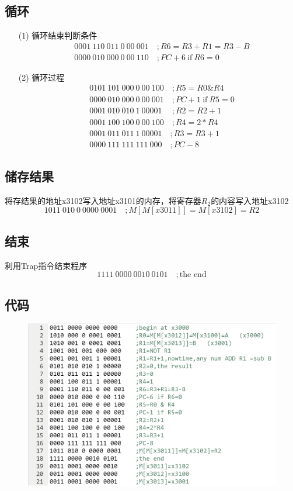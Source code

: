 \documentclass[UTF8]{ctexart}
\begin{document}
\subsection{循环}
\begin{enumerate}
    \item [(1)]循环结束判断条件
    \begin{align*}
        &0001\ 110\ 011\ 0\ 00\ 001\quad   ;R6=R3+R1=R3-B\\
        &0000\ 010\ 000\ 0\ 00\ 110\quad   ;PC+6\ \mbox{if}\ R6=0
    \end{align*}
    \item [(2)]循环过程
    \begin{align*}
        &0101\ 101\ 000\ 0\ 00\ 100\quad   ;R5=R0 \& R4\\
        &0000\ 010\ 000\ 0\ 00\ 001\quad   ;PC+1\ \mbox{if}\ R5=0\\
        &0001\ 010\ 010\ 1\ 00001\ \quad   ;R2=R2+1\\
        &0001\ 100\ 100\ 0\ 00\ 100\quad   ;R4=2*R4\\
        &0001\ 011\ 011\ 1\ 00001 \quad   ;R3=R3+1\\
        &0000\ 111\ 111\ 111\ 000 \quad   ;PC-8
    \end{align*}
\end{enumerate}

\subsection{储存结果}
    将存结果的地址x3102写入地址x3101的内存，将寄存器$R_2$的内容写入地址x3102
    \[
        1011\ 010\ 0\ 0000\ 0001\quad    ;M[M[x3011]]=M[x3102]=R2
    \]
\subsection{结束}  
    利用Trap指令结束程序
    \[
        1111\ 0000\ 0010\ 0101\quad     ;\mbox{the end}
    \]
\subsection{代码}    
    \begin{figure}[htbp]
        \centering
        \includegraphics[scale=0.8]{code.png}
    \end{figure}
\end{document}
